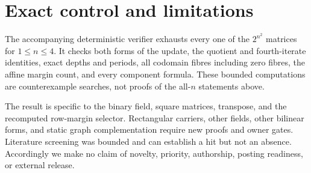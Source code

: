 \documentclass[10pt,a4paper]{amsart}
\theoremstyle{definition}
\theoremstyle{remark}
\begin{document}
\section{Exact control and limitations}

The accompanying deterministic verifier exhausts every one of the
$2^{n^2}$ matrices for $1\le n\le4$.  It checks both forms of the update,
the quotient and fourth-iterate identities, exact depths and periods, all
codomain fibres including zero fibres, the affine margin count, and every
component formula.  These bounded computations are counterexample searches,
not proofs of the all-$n$ statements above.

The result is specific to the binary field, square matrices, transpose, and
the recomputed row-margin selector.  Rectangular carriers, other fields,
other bilinear forms, and static graph complementation require new proofs and
owner gates.  Literature screening was bounded and can establish a hit but
not an absence.  Accordingly we make no claim of novelty, priority,
authorship, posting readiness, or external release.



\end{document}
